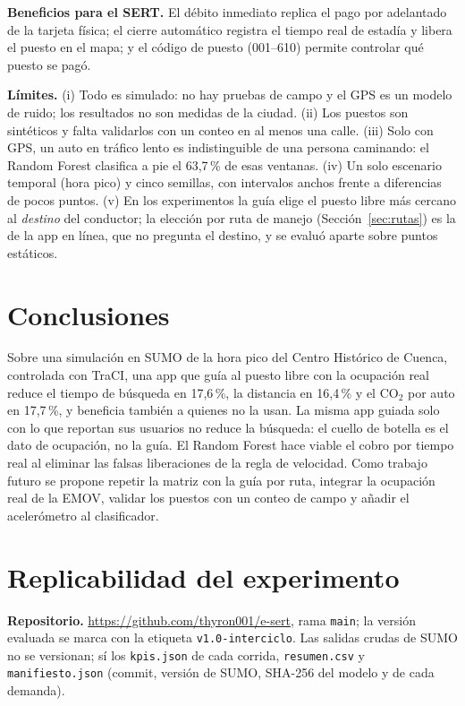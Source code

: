 \documentclass[conference]{IEEEtran}
\newcommand{\cod}[1]{\texttt{#1}}
\begin{document}
\textbf{Beneficios para el SERT.} El débito inmediato replica el pago por adelantado de la tarjeta física; el cierre automático registra el tiempo real de estadía y libera el puesto en el mapa; y el código de puesto (001--610) permite controlar qué puesto se pagó.

\textbf{Límites.} (i) Todo es simulado: no hay pruebas de campo y el GPS es un modelo de ruido; los resultados no son medidas de la ciudad. (ii) Los puestos son sintéticos y falta validarlos con un conteo en al menos una calle. (iii) Solo con GPS, un auto en tráfico lento es indistinguible de una persona caminando: el Random Forest clasifica a pie el 63,7\,\% de esas ventanas. (iv) Un solo escenario temporal (hora pico) y cinco semillas, con intervalos anchos frente a diferencias de pocos puntos. (v) En los experimentos la guía elige el puesto libre más cercano al \emph{destino} del conductor; la elección por ruta de manejo (Sección~\ref{sec:rutas}) es la de la app en línea, que no pregunta el destino, y se evaluó aparte sobre puntos estáticos.

\section{Conclusiones}
Sobre una simulación en SUMO de la hora pico del Centro Histórico de Cuenca, controlada con TraCI, una app que guía al puesto libre con la ocupación real reduce el tiempo de búsqueda en 17,6\,\%, la distancia en 16,4\,\% y el CO$_2$ por auto en 17,7\,\%, y beneficia también a quienes no la usan. La misma app guiada solo con lo que reportan sus usuarios no reduce la búsqueda: el cuello de botella es el dato de ocupación, no la guía. El Random Forest hace viable el cobro por tiempo real al eliminar las falsas liberaciones de la regla de velocidad. Como trabajo futuro se propone repetir la matriz con la guía por ruta, integrar la ocupación real de la EMOV, validar los puestos con un conteo de campo y añadir el acelerómetro al clasificador.

\section{Replicabilidad del experimento}
\label{sec:replica}
\textbf{Repositorio.} \url{https://github.com/thyron001/e-sert}, rama \cod{main}; la versión evaluada se marca con la etiqueta \cod{v1.0-interciclo}. Las salidas crudas de SUMO no se versionan; sí los \cod{kpis.json} de cada corrida, \cod{resumen.csv} y \cod{manifiesto.json} (commit, versión de SUMO, SHA-256 del modelo y de cada demanda).
\end{document}

